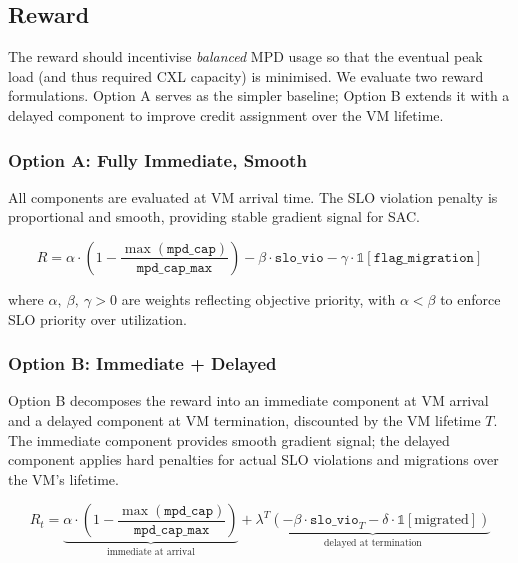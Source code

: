 \documentclass[11pt]{article}
\begin{document}
\subsection{Reward}
\label{sec:reward}

The reward should incentivise \emph{balanced} MPD usage so that the eventual
peak load (and thus required CXL capacity) is minimised. We evaluate two
reward formulations. Option A serves as the simpler baseline; Option B
extends it with a delayed component to improve credit assignment over the
VM lifetime.

\subsubsection*{Option A: Fully Immediate, Smooth}

All components are evaluated at VM arrival time. The SLO violation penalty
is proportional and smooth, providing stable gradient signal for SAC.

\begin{equation}
    R = \alpha \cdot \left(1 - \frac{\max(\texttt{mpd\_cap})}{\texttt{mpd\_cap\_max}}\right)
      - \beta \cdot \texttt{slo\_vio}
      - \gamma \cdot \mathbb{1}[\texttt{flag\_migration}]
    \label{eq:reward_a}
\end{equation}

where $\alpha,\ \beta,\ \gamma > 0$ are weights reflecting objective priority,
with $\alpha < \beta$ to enforce SLO priority over utilization.

\subsubsection*{Option B: Immediate + Delayed}

Option B decomposes the reward into an immediate component at VM arrival
and a delayed component at VM termination, discounted by the VM lifetime $T$.
The immediate component provides smooth gradient signal; the delayed component
applies hard penalties for actual SLO violations and migrations over the
VM's lifetime.

\begin{equation}
    R_t = \underbrace{\alpha \cdot \left(1 - \frac{\max(\texttt{mpd\_cap})}{\texttt{mpd\_cap\_max}}\right)}_{\text{immediate at arrival}}
        + \underbrace{\lambda^{T} \left(- \beta \cdot \texttt{slo\_vio}_{T} - \delta \cdot \mathbb{1}[\text{migrated}]\right)}_{\text{delayed at termination}}
    \label{eq:reward_b}
\end{equation}
\end{document}
